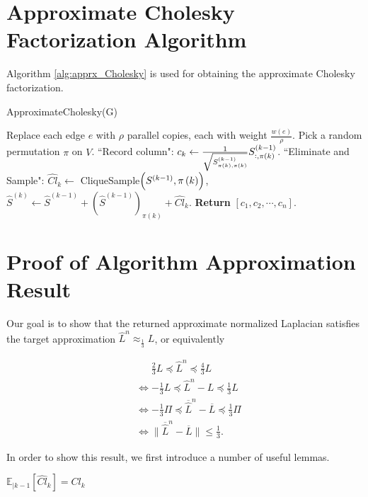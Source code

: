 \documentclass[11pt]{article}
\newcommand{\CExp}[1]{\mathbb{E}_{|#1}}
\begin{document}
\section{Approximate Cholesky Factorization Algorithm}
Algorithm \ref{alg:apprx_Cholesky} is used for obtaining the approximate Cholesky factorization.

\begin{algorithm}
	\caption{ApproximateCholesky(G)}\label{alg:apprx_Cholesky}
	\begin{algorithmic}[1]
		\State Replace each edge $ e $ with $ \rho $ parallel copies, each with weight $ \frac{w(e)}{\rho} $.
		\State Pick a random permutation $ \pi $ on $ V $.
			\State ``Record column": $ c_{k} \gets \frac{1}{\sqrt{S^{\paren{k-1}}_{\pi(k),\pi(k)}}}S^{(k-1)}_{:,\pi(k)} $.
			\State ``Eliminate and Sample": $ \widehat{Cl}_{k} \gets $ CliqueSample$ \paren{S^{\paren{k-1}},\pi\paren{k}} $, 
			\State \-\hspace{4.25cm} $ \widehat{S}^{(k)} \gets \widehat{S}^{(k-1)} + (\widehat{S}^{(k-1)})_{\pi(k)} + \widehat{Cl}_{k} $.
		\EndFor
		\State \textbf{Return} $[c_{1}, c_{2}, \cdots, c_{n}]$.
	\end{algorithmic}
\end{algorithm}

\section{Proof of Algorithm Approximation Result}
Our goal is to show that the returned approximate normalized Laplacian satisfies the target approximation $ \widehat{L}^{n} \approx_{\frac{1}{3}} L $, or equivalently 

\begin{align*}
&~~~~~~~ \frac{2}{3}L \preccurlyeq \widehat{L}^{n} \preccurlyeq \frac{4}{3}L \\
& \Leftrightarrow -\frac{1}{3}L \preccurlyeq \widehat{L}^{n} - L \preccurlyeq \frac{1}{3}L \\
& \Leftrightarrow -\frac{1}{3}\Pi \preccurlyeq \overline{\widehat{L}}^{n} - \overline{L} \preccurlyeq \frac{1}{3}\Pi \\
& \Leftrightarrow \lVert \overline{\widehat{L}}^{n} - \overline{L} \rVert \leq \frac{1}{3}.
\end{align*}

In order to show this result, we first introduce a number of useful lemmas.

\begin{lemma}\label{lem:lem1}
	$ \CExp{k-1}\left[\widehat{Cl}_{k}\right] = Cl_{k}$
\end{lemma}
\end{document}
